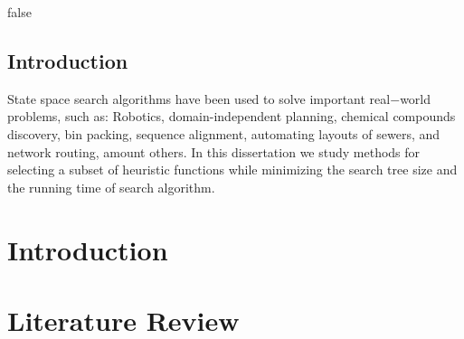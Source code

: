 \documentclass[
	12pt,				%
	openright,		nsubseteq	%
	twoside,			%
	a4paper,			%
	english,			%
	french,				%
	spanish,			%
	brazil				%
	]{abntex2}
\begin{document}
\tableofcontents*
\cleardoublepage



\textual

\if false
\chapter*[Introduction]{Introduction}

\noindent
State space search algorithms have been used to solve important real$-$world problems, such as: Robotics, domain-independent planning, chemical compounds discovery, bin packing, sequence alignment, automating layouts of sewers, and network routing, amount others. In this dissertation we study methods for selecting a subset of heuristic functions while minimizing the search tree size and the running time of search algorithm.

\fi
\part{Introduction}


%

\part{Literature Review}

\end{document}
